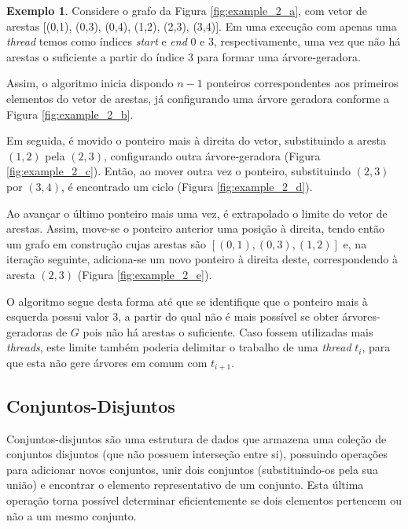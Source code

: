 \documentclass[article,a4paper,12pt,brazil,sumario=tradicional]{abntex2}
\theoremstyle{definition} %
\newtheorem{example}{Exemplo}
\begin{document}
\begin{example}

Considere o grafo da Figura \ref{fig:example_2_a}, com vetor de arestas [(0,1), (0,3), (0,4), (1,2), (2,3), (3,4)]. Em uma execução com apenas uma \textit{thread} temos como índices \textit{start} e \textit{end} 0 e 3, respectivamente, uma vez que não há arestas o suficiente a partir do índice $3$ para formar uma árvore-geradora.

Assim, o algoritmo inicia dispondo $n - 1$ ponteiros correspondentes aos primeiros elementos do vetor de arestas, já configurando uma árvore geradora conforme a Figura \ref{fig:example_2_b}.

Em seguida, é movido o ponteiro mais à direita do vetor, substituindo a aresta $(1,2)$ pela $(2,3)$, configurando outra árvore-geradora (Figura \ref{fig:example_2_c}). Então, ao mover outra vez o ponteiro, substituindo $(2,3)$ por $(3,4)$, é encontrado um ciclo (Figura \ref{fig:example_2_d}).

Ao avançar o último ponteiro mais uma vez, é extrapolado o limite do vetor de arestas. Assim, move-se o ponteiro anterior uma posição à direita, tendo então um grafo em construção cujas arestas são $[(0,1),(0,3),(1,2)]$ e, na iteração seguinte, adiciona-se um novo ponteiro à direita deste, correspondendo à aresta $(2,3)$ (Figura \ref{fig:example_2_e}).

O algoritmo segue desta forma até que se identifique que o ponteiro mais à esquerda possui valor $3$, a partir do qual não é mais possível se obter árvores-geradoras de $G$ pois não há arestas o suficiente. Caso fossem utilizadas mais \textit{threads}, este limite também poderia delimitar o trabalho de uma \textit{thread} $t_i$, para que esta não gere árvores em comum com $t_{i+1}$.

\end{example}

\subsection{Conjuntos-Disjuntos}
\label{conjuntos-disjuntos}

Conjuntos-disjuntos são uma estrutura de dados que armazena uma coleção de conjuntos disjuntos (que não possuem interseção entre si), possuindo operações para adicionar novos conjuntos, unir dois conjuntos (substituindo-os pela sua união) e encontrar o elemento representativo de um conjunto. Esta última operação torna possível determinar eficientemente se dois elementos pertencem ou não a um mesmo conjunto.
\end{document}
